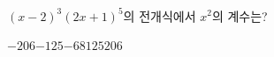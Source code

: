 $(x-2)^3(2x+1)^5$의 전개식에서 $x^2$의 계수는?
\begin{choices32}{$-206$}{$-125$}{$-68$}{$125$}{$206$}\end{choices32}
